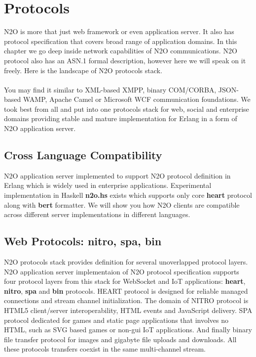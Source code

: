 \section{Protocols}
N2O is more that just web framework or even application server.
It also has protocol specification that covers broad range of application domains.
In this chapter we go deep inside network capabilities of N2O communications.
N2O protocol also has an ASN.1 formal description, however here we will speak on it freely.
Here is the landscape of N2O protocols stack.


\paragraph{}
You may find it similar to XML-based XMPP, binary COM/CORBA,
JSON-based WAMP, Apache Camel or Microsoft WCF communication foundations.
We took best from all and put into one protocols stack for web,
social and enterprise domains providing stable and mature implementation for Erlang
in a form of N2O application server.

\newpage
\subsection*{Cross Language Compatibility}
N2O application server implemented to support N2O protocol definition
in Erlang which is widely used in enterprise applications.
Experimental implementation in Haskell {\bf n2o.hs} exists
which supports only core {\bf heart} protocol along with {\bf bert} formatter.
We will show you how N2O clients are compatible across
different server implementations in different languages.

\subsection*{Web Protocols: {\bf nitro}, {\bf spa}, {\bf bin}}
N2O protocols stack provides definition for several unoverlapped protocol layers.
N2O application server implementaion of N2O protocol specification supports
four protocol layers from this stack for WebSocket and IoT applications: {\bf heart}, {\bf nitro}, {\bf spa} and {\bf bin} protocols.
HEART protocol is designed for reliable managed connections and stream channel initialization.
The domain of NITRO protocol is HTML5 client/server interoperability, HTML events and JavaScript delivery.
SPA protocol dedicated for games and static page applications that involves no HTML,
such as SVG based games or non-gui IoT applications.
And finally binary file transfer protocol for images and gigabyte file uploads and downloads.
All these protocols transfers coexist in the same multi-channel stream.

